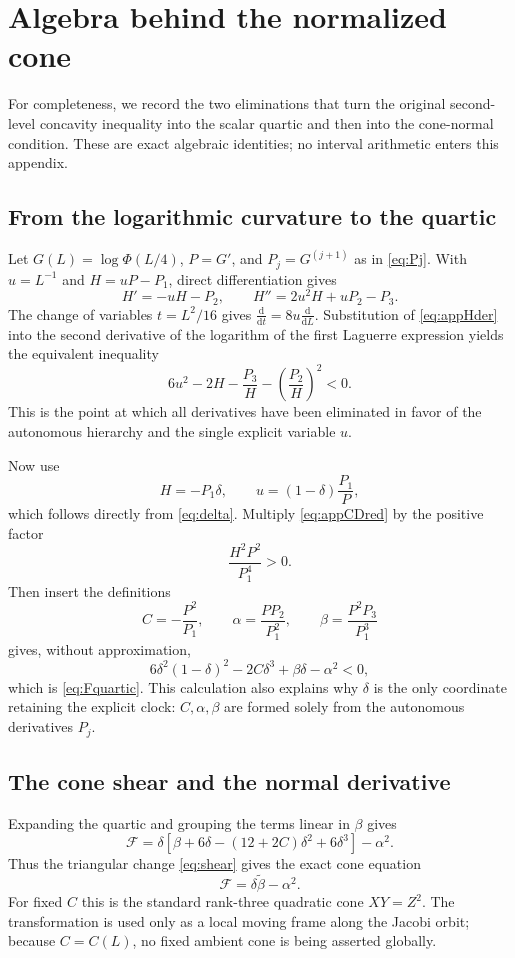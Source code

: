 \documentclass{amsart}
\numberwithin{equation}{section}
\theoremstyle{definition}
\theoremstyle{remark}
\newcommand{\D}{\mathrm d}
\newcommand{\Fcal}{\mathcal F}
\begin{document}
\appendix
\section{Algebra behind the normalized cone}\label{app:conealgebra}
For completeness, we record the two eliminations that turn the original second-level concavity inequality into the scalar quartic and then into the cone-normal condition.  These are exact algebraic identities; no interval arithmetic enters this appendix.

\subsection{From the logarithmic curvature to the quartic}
Let $G(L)=\log\Phi(L/4)$, $P=G'$, and $P_j=G^{(j+1)}$ as in \eqref{eq:Pj}.  With $u=L^{-1}$ and $H=uP-P_1$, direct differentiation gives
\begin{equation}\label{eq:appHder}
 H'=-uH-P_2,
 \qquad
 H''=2u^2H+uP_2-P_3.
\end{equation}
The change of variables $t=L^2/16$ gives $\frac{\D}{\D t}=8u\frac{\D}{\D L}$.  Substitution of \eqref{eq:appHder} into the second derivative of the logarithm of the first Laguerre expression yields the equivalent inequality
\begin{equation}\label{eq:appCDred}
 6u^2-2H-\frac{P_3}{H}-\left(\frac{P_2}{H}\right)^2<0.
\end{equation}
This is the point at which all derivatives have been eliminated in favor of the autonomous hierarchy and the single explicit variable $u$.

Now use
\[
 H=-P_1\delta,
 \qquad
 u=(1-\delta)\frac{P_1}{P},
\]
which follows directly from \eqref{eq:delta}.  Multiply \eqref{eq:appCDred} by the positive factor
\[
 \frac{H^2P^2}{P_1^4}>0.
\]
Then insert the definitions
\[
 C=-\frac{P^2}{P_1},\qquad
 \alpha=\frac{PP_2}{P_1^2},\qquad
 \beta=\frac{P^2P_3}{P_1^3}
\]
gives, without approximation,
\[
 6\delta^2(1-\delta)^2-2C\delta^3+\beta\delta-\alpha^2<0,
\]
which is \eqref{eq:Fquartic}.  This calculation also explains why $\delta$ is the only coordinate retaining the explicit clock: $C,\alpha,\beta$ are formed solely from the autonomous derivatives $P_j$.

\subsection{The cone shear and the normal derivative}
Expanding the quartic and grouping the terms linear in $\beta$ gives
\[
 \Fcal
 =\delta\left[\beta+6\delta-(12+2C)\delta^2+6\delta^3\right]-\alpha^2.
\]
Thus the triangular change \eqref{eq:shear} gives the exact cone equation
\[
 \Fcal=\delta\widetilde\beta-\alpha^2.
\]
For fixed $C$ this is the standard rank-three quadratic cone $XY=Z^2$.  The transformation is used only as a local moving frame along the Jacobi orbit; because $C=C(L)$, no fixed ambient cone is being asserted globally.
\end{document}
